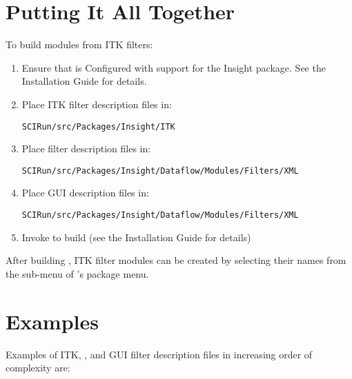 \section{Putting It All Together}
\label{sec:itk_mods:put_together}

To build \sr{} modules from ITK filters:

\begin{enumerate}
\item Ensure that \sr{} is Configured with support for the Insight
  package.  See the \sr{} Installation Guide for details.
\item Place ITK filter description files in:
  \begin{alltt}
    SCIRun/src/Packages/Insight/ITK
  \end{alltt}
\item Place \sr{} filter description files in:
  \begin{alltt}
    SCIRun/src/Packages/Insight/Dataflow/Modules/Filters/XML
  \end{alltt}
\item Place \sr{} GUI description files in:
  \begin{alltt}
    SCIRun/src/Packages/Insight/Dataflow/Modules/Filters/XML
  \end{alltt}
\item Invoke  to build \sr{} (see the \sr{}
  Installation Guide for details)
\end{enumerate}

After building \sr{}, ITK filter modules can be created by selecting
their names from the  sub-menu of \sr{}'s 
package menu.

\section{Examples}
\label{sec:itk_mods:example}

Examples of ITK, \sr{}, and GUI filter description files in increasing
order of complexity are:

